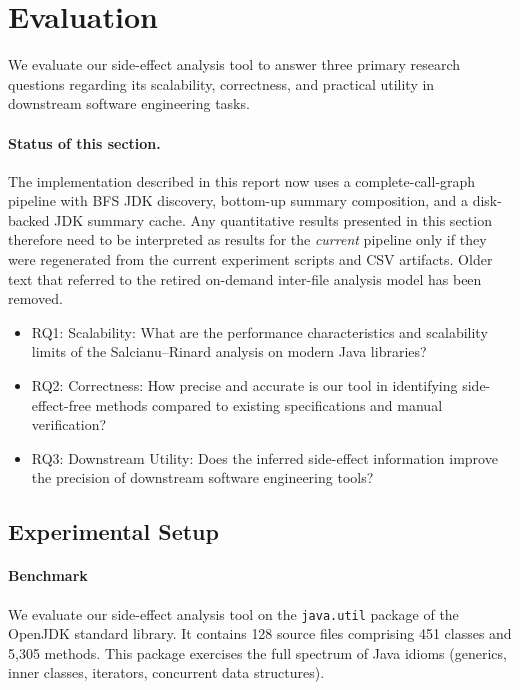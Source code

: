\section{Evaluation}
We evaluate our side-effect analysis tool to answer three primary research questions regarding its scalability, correctness, and practical utility in downstream software engineering tasks.

\paragraph{Status of this section.}
The implementation described in this report now uses a complete-call-graph pipeline with BFS JDK discovery, bottom-up summary composition, and a disk-backed JDK summary cache. Any quantitative results presented in this section therefore need to be interpreted as results for the \emph{current} pipeline only if they were regenerated from the current experiment scripts and CSV artifacts. Older text that referred to the retired on-demand inter-file analysis model has been removed.


\begin{itemize}
    \item RQ1: Scalability: What are the performance characteristics and scalability limits of the Salcianu--Rinard analysis on modern Java libraries?

    \item RQ2: Correctness: How precise and accurate is our tool in identifying side-effect-free methods compared to existing specifications and manual verification?

    \item RQ3: Downstream Utility: Does the inferred side-effect information improve the precision of downstream software engineering tools?
\end{itemize}

\subsection{Experimental Setup}

\paragraph{Benchmark}
We evaluate our side-effect analysis tool on the \texttt{java.util} package of the OpenJDK standard library. It contains 128 source files comprising 451 classes and 5,305 methods.
This package exercises the full spectrum of Java idioms (generics, inner classes, iterators, concurrent data structures). 

